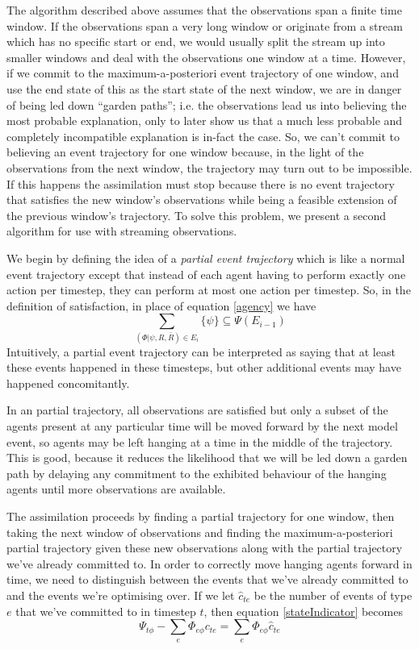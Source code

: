 \documentclass{article}
\begin{document}
The algorithm described above assumes that the observations span a finite time window. If the observations span a very long window or originate from a stream which has no specific start or end, we would usually split the stream up into smaller windows and deal with the observations one window at a time. However, if we commit to the maximum-a-posteriori event trajectory of one window, and use the end state of this as the start state of the next window, we are in danger of being led down ``garden paths''; i.e. the observations lead us into believing the most probable explanation, only to later show us that a much less probable and completely incompatible explanation is in-fact the case. So, we can't commit to believing an event trajectory for one window because, in the light of the observations from the next window, the trajectory may turn out to be impossible. If this happens the assimilation must stop because there is no event trajectory that satisfies the new window's observations while being a feasible extension of the previous window's trajectory. To solve this problem, we present a second algorithm for use with streaming observations.

We begin by defining the idea of a \textit{partial event trajectory} which is like a normal event trajectory except that instead of each agent having to perform exactly one action per timestep, they can perform at most one action per timestep. So, in the definition of satisfaction, in place of equation \ref{agency} we have
\begin{equation}
\sum_{(\Phi|\psi,R,\bar{R})\in E_i}\{\psi\} \subseteq \Psi(E_{i-1})
\label{partial}
\end{equation}
Intuitively, a partial event trajectory can be interpreted as saying that at least these events happened in these timesteps, but other additional events may have happened concomitantly.

In an partial trajectory, all observations are satisfied but only a subset of the agents present at any particular time will be moved forward by the next model event, so agents may be left hanging at a time in the middle of the trajectory. This is good, because it reduces the likelihood that we will be led down a garden path by delaying any commitment to the exhibited behaviour of the hanging agents until more observations are available.

The assimilation proceeds by finding a partial trajectory for one window, then taking the next window of observations and finding the maximum-a-posteriori partial trajectory given these new observations along with the partial trajectory we've already committed to. In order to correctly move hanging agents forward in time, we need to distinguish between the events that we've already committed to and the events we're optimising over. If we let $\hat{c}_{te}$ be the number of events of type $e$ that we've committed to in timestep $t$, then equation \ref{stateIndicator} becomes
\begin{equation}
\Psi_{t\phi} -  \sum_e\Phi_{e\phi}c_{te} = \sum_e\Phi_{e\phi}\hat{c}_{te}
\label{stateIndicator}
\end{equation}
\end{document}
